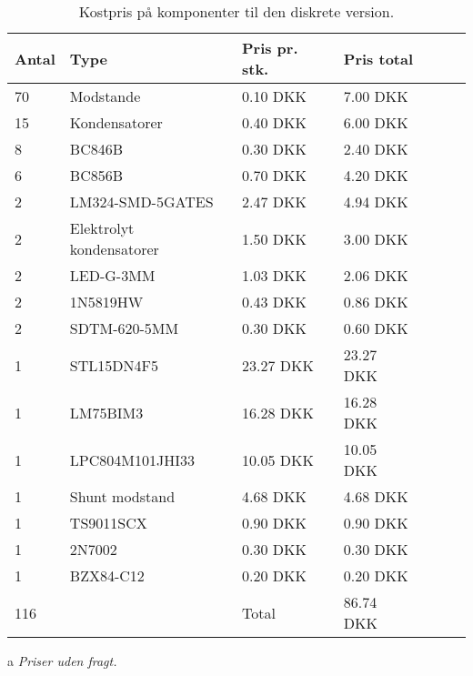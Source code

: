 \begin{table}[h!]
	\small
	\centering
	\begin{threeparttable}
		\begin{tabular}{ l l l l l l l }
			\toprule
			\multicolumn{1}{l}{\textbf{Antal}}          &
			\multicolumn{1}{l}{\textbf{Type}}           &
			\multicolumn{1}{l}{\textbf{Pris pr. stk.}}  &
			\multicolumn{1}{l}{\textbf{Pris total}}   \\ 
			\hline
			70 &  Modstande                 &  0.10 DKK   &  7.00 DKK  \\
			15 &  Kondensatorer             &  0.40 DKK   &  6.00 DKK  \\
		    8  &  BC846B                    &  0.30 DKK   &  2.40 DKK  \\
		    6  &  BC856B                    &  0.70 DKK   &  4.20 DKK  \\
		    2  &  LM324-SMD-5GATES          &  2.47 DKK   &  4.94 DKK  \\ 
			2  &  Elektrolyt kondensatorer  &  1.50 DKK   &  3.00 DKK  \\
			2  &  LED-G-3MM                 &  1.03 DKK   &  2.06 DKK  \\
	 	    2  &  1N5819HW                  &  0.43 DKK   &  0.86 DKK  \\
	 	    2  &  SDTM-620-5MM              &  0.30 DKK   &  0.60 DKK  \\ 
		    1  &  STL15DN4F5                & 23.27 DKK   & 23.27 DKK  \\
		    1  &  LM75BIM3                  & 16.28 DKK   & 16.28 DKK  \\
		   	1  &  LPC804M101JHI33           & 10.05 DKK   & 10.05 DKK  \\
		   	1  &  Shunt modstand            &  4.68 DKK   &  4.68 DKK  \\
		   	1  &  TS9011SCX                 &  0.90 DKK   &  0.90 DKK  \\
  			1  &  2N7002                    &  0.30 DKK   &  0.30 DKK  \\
	  	    1  &  BZX84-C12                 &  0.20 DKK   &  0.20 DKK  \\
	        \hline
	  	   116 &                            & Total       & 86.74 DKK  \\  
			\hline
			\bottomrule
		\end{tabular}
		\begin{tablenotes}
		\item[a] \textit{Priser uden fragt.}
		\end{tablenotes}
		\caption{Kostpris på komponenter til den diskrete version.}
		\label{tab:pris_diskret}
	\end{threeparttable}
\end{table} 
\FloatBlock



